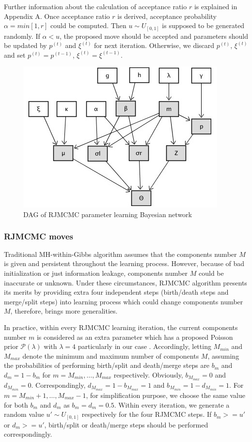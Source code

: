 \documentclass[conference]{IEEEtran}
\begin{document}
Further information about the calculation of acceptance ratio
$r$ is explained in Appendix A. Once acceptance ratio $r$ is derived, acceptance probability $\alpha = min[1,r]$ \cite{Luengo2013} could be computed. Then $u \sim U_{[0,1]}$ is supposed to be generated randomly. If $\alpha < u$, the proposed move should be accepted and parameters should be updated by $p^{(t)}$ and $\xi^{(t)}$ for next iteration. Otherwise, we discard $p^{(t)}$, $\xi^{(t)}$ and set $p^{(t)} = p^{(t-1)}$, $\xi^{(t)} = \xi^{(t-1)}$. 
\bigskip

\begin{figure}[b]
\centering
\includegraphics[width=0.4\paperwidth]{DAG_RJMCMC.jpg}
\caption{DAG of RJMCMC parameter learning Bayesian network}
\label{fig:1}
\end{figure}

\subsubsection*{RJMCMC moves}
Traditional MH-within-Gibbs algorithm assumes that the components number $M$ is given and persistent throughout the learning process. However, because of bad initialization or just information leakage, components number $M$ could be inaccurate or unknown. Under these circumstances, RJMCMC algorithm presents its merits by providing extra four independent steps (birth/death steps and merge/split steps) into learning process which could change components number $M$, therefore, brings more generalities. 

In practice, within every RJMCMC learning iteration, the current components number $m$ is considered as an extra parameter which has a proposed Poisson prior $\mathcal{P}(\lambda)$ with $\lambda = 4$ particularly in our case \cite{Richardson1997}. Accordingly, letting $M_{min}$ and $M_{max}$ denote the minimum and maximum number of components $M$, assuming the probabilities of performing birth/split and death/merge steps are $b_m$ and $d_m = 1 - b_m$ for $m = M_{min},\dots,M_{max}$ respectively. Obviously, $b_{M_{max}}=0$ and $d_{M_{min}}=0$. Correspondingly, $d_{M_{max}}=1-b_{M_{max}} = 1$ and $b_{M_{min}}=1-d_{M_{min}}=1$. For $m=M_{min}+1,\dots,M_{max}-1$, for simplification purpose, we choose the same value for both $b_m$ and $d_m$ as $b_m=d_m=0.5$. Within every iteration, we generate a random value $u' \sim U_{[0,1]}$ respectively for the four RJMCMC steps. If $b_m >= u'$ or $d_m >= u'$, birth/split or death/merge steps should be performed correspondingly.\cite{Richardson1997}
\end{document}
